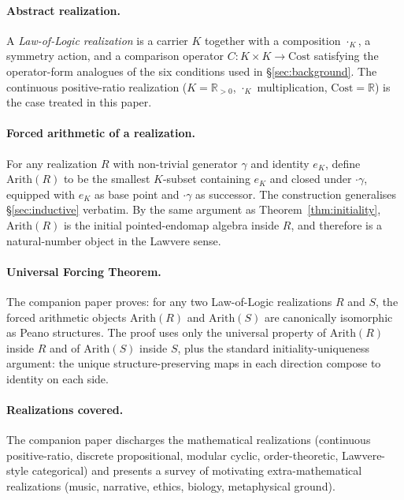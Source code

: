 \documentclass[11pt,a4paper]{article}
\theoremstyle{definition}
\theoremstyle{remark}
\begin{document}
\paragraph{Abstract realization.} A \emph{Law-of-Logic realization} is
a carrier $K$ together with a composition $\cdot_K$, a symmetry
action, and a comparison operator $C : K \times K \to \mathrm{Cost}$
satisfying the operator-form analogues of the six conditions used in
\S\ref{sec:background}. The continuous positive-ratio realization
($K = \mathbb{R}_{>0}$, $\cdot_K$ multiplication, $\mathrm{Cost} =
\mathbb{R}$) is the case treated in this paper.

\paragraph{Forced arithmetic of a realization.} For any realization
$R$ with non-trivial generator $\gamma$ and identity $e_K$, define
$\mathrm{Arith}(R)$ to be the smallest $K$-subset containing $e_K$ and
closed under $\cdot \gamma$, equipped with $e_K$ as base point and
$\cdot \gamma$ as successor. The construction generalises
\S\ref{sec:inductive} verbatim. By the same argument as
Theorem~\ref{thm:initiality}, $\mathrm{Arith}(R)$ is the initial
pointed-endomap algebra inside $R$, and therefore is a natural-number
object in the Lawvere sense.

\paragraph{Universal Forcing Theorem.} The companion paper proves: for
any two Law-of-Logic realizations $R$ and $S$, the forced arithmetic
objects $\mathrm{Arith}(R)$ and $\mathrm{Arith}(S)$ are canonically
isomorphic as Peano structures. The proof uses only the universal
property of $\mathrm{Arith}(R)$ inside $R$ and of $\mathrm{Arith}(S)$
inside $S$, plus the standard initiality-uniqueness argument: the
unique structure-preserving maps in each direction compose to identity
on each side.

\paragraph{Realizations covered.} The companion paper discharges the
mathematical realizations (continuous positive-ratio, discrete
propositional, modular cyclic, order-theoretic, Lawvere-style
categorical) and presents a survey of motivating extra-mathematical
realizations (music, narrative, ethics, biology, metaphysical
ground).
\end{document}

